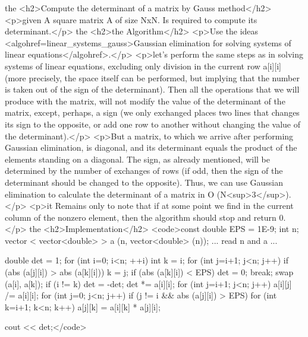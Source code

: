 the <h2>Compute the determinant of a matrix by Gauss method</h2>
<p>given A square matrix A of size NxN. Is required to compute its determinant.</p>
the <h2>the Algorithm</h2>
<p>Use the ideas <algohref=linear_systems_gauss>Gaussian elimination for solving systems of linear equations</algohref>.</p>
<p>let's perform the same steps as in solving systems of linear equations, excluding only division in the current row a[i][i] (more precisely, the space itself can be performed, but implying that the number is taken out of the sign of the determinant). Then all the operations that we will produce with the matrix, will not modify the value of the determinant of the matrix, except, perhaps, a sign (we only exchanged places two lines that changes its sign to the opposite, or add one row to another without changing the value of the determinant).</p>
<p>But a matrix, to which we arrive after performing Gaussian elimination, is diagonal, and its determinant equals the product of the elements standing on a diagonal. The sign, as already mentioned, will be determined by the number of exchanges of rows (if odd, then the sign of the determinant should be changed to the opposite). Thus, we can use Gaussian elimination to calculate the determinant of a matrix in O (N<sup>3</sup>).</p>
<p>it Remains only to note that if at some point we find in the current column of the nonzero element, then the algorithm should stop and return 0.</p>
the <h2>Implementation</h2>
<code>const double EPS = 1E-9;
int n;
vector < vector<double> > a (n, vector<double> (n));
... read n and a ...

double det = 1;
for (int i=0; i<n; ++i) {
int k = i;
for (int j=i+1; j<n; j++)
if (abs (a[j][i]) > abs (a[k][i]))
k = j;
if (abs (a[k][i]) < EPS) {
det = 0;
break;
}
swap (a[i], a[k]);
if (i != k)
det = -det;
det *= a[i][i];
for (int j=i+1; j<n; j++)
a[i][j] /= a[i][i];
for (int j=0; j<n; j++)
if (j != i && abs (a[j][i]) > EPS)
for (int k=i+1; k<n; k++)
a[j][k] = a[i][k] * a[j][i];
}

cout << det;</code>